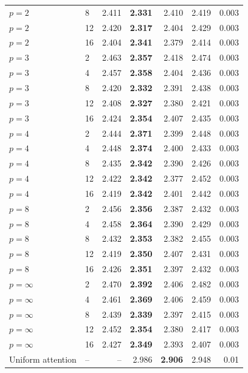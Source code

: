 \begin{longtable}{llrrrrr}
$p=2$ & 8 & 2.411 & \textbf{2.331} & 2.410 & 2.419 & 0.003 \\
$p=2$ & 12 & 2.420 & \textbf{2.317} & 2.404 & 2.429 & 0.003 \\
$p=2$ & 16 & 2.404 & \textbf{2.341} & 2.379 & 2.414 & 0.003 \\
$p=3$ & 2 & 2.463 & \textbf{2.357} & 2.418 & 2.474 & 0.003 \\
$p=3$ & 4 & 2.457 & \textbf{2.358} & 2.404 & 2.436 & 0.003 \\
$p=3$ & 8 & 2.420 & \textbf{2.332} & 2.391 & 2.438 & 0.003 \\
$p=3$ & 12 & 2.408 & \textbf{2.327} & 2.380 & 2.421 & 0.003 \\
$p=3$ & 16 & 2.424 & \textbf{2.354} & 2.407 & 2.435 & 0.003 \\
$p=4$ & 2 & 2.444 & \textbf{2.371} & 2.399 & 2.448 & 0.003 \\
$p=4$ & 4 & 2.448 & \textbf{2.374} & 2.400 & 2.433 & 0.003 \\
$p=4$ & 8 & 2.435 & \textbf{2.342} & 2.390 & 2.426 & 0.003 \\
$p=4$ & 12 & 2.422 & \textbf{2.342} & 2.377 & 2.452 & 0.003 \\
$p=4$ & 16 & 2.419 & \textbf{2.342} & 2.401 & 2.442 & 0.003 \\
$p=8$ & 2 & 2.456 & \textbf{2.356} & 2.387 & 2.432 & 0.003 \\
$p=8$ & 4 & 2.458 & \textbf{2.364} & 2.390 & 2.429 & 0.003 \\
$p=8$ & 8 & 2.432 & \textbf{2.353} & 2.382 & 2.455 & 0.003 \\
$p=8$ & 12 & 2.419 & \textbf{2.350} & 2.407 & 2.431 & 0.003 \\
$p=8$ & 16 & 2.426 & \textbf{2.351} & 2.397 & 2.432 & 0.003 \\
$p=\infty$ & 2 & 2.470 & \textbf{2.392} & 2.406 & 2.482 & 0.003 \\
$p=\infty$ & 4 & 2.461 & \textbf{2.369} & 2.406 & 2.459 & 0.003 \\
$p=\infty$ & 8 & 2.439 & \textbf{2.339} & 2.397 & 2.415 & 0.003 \\
$p=\infty$ & 12 & 2.452 & \textbf{2.354} & 2.380 & 2.417 & 0.003 \\
$p=\infty$ & 16 & 2.427 & \textbf{2.349} & 2.393 & 2.407 & 0.003 \\
Uniform attention & -- & -- & 2.986 & \textbf{2.906} & 2.948 & 0.01 \\
\bottomrule
\end{longtable}

